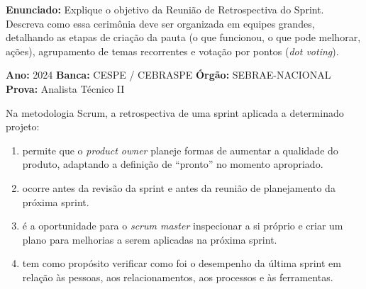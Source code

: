 \documentclass[12pt]{article}
\begin{document}
\vspace{0.15cm}
\noindent\textbf{Enunciado:} Explique o objetivo da Reunião de Retrospectiva do Sprint. Descreva como essa cerimônia deve ser organizada em equipes grandes, detalhando as etapas de criação da pauta (o que funcionou, o que pode melhorar, ações), agrupamento de temas recorrentes e votação por pontos (\textit{dot voting}).

\vspace{0.2cm}
\begin{caixaResposta}
\end{caixaResposta}

\vspace{0.6cm}

\vspace{0.15cm}

\begin{metaConcurso}
\small \textbf{Ano:} 2024 \qquad \textbf{Banca:} CESPE / CEBRASPE \qquad \textbf{Órgão:} SEBRAE-NACIONAL \qquad \textbf{Prova:} Analista Técnico II
\end{metaConcurso}

\vspace{0.15cm}
\noindent Na metodologia Scrum, a retrospectiva de uma sprint aplicada a determinado projeto:

\begin{enumerate}[label=\Alph*)]
    \item permite que o \textit{product owner} planeje formas de aumentar a qualidade do produto, adaptando a definição de ``pronto'' no momento apropriado.
    \item ocorre antes da revisão da sprint e antes da reunião de planejamento da próxima sprint.
    \item é a oportunidade para o \textit{scrum master} inspecionar a si próprio e criar um plano para melhorias a serem aplicadas na próxima sprint.
    \item tem como propósito verificar como foi o desempenho da última sprint em relação às pessoas, aos relacionamentos, aos processos e às ferramentas.
\end{enumerate}

\vspace{0.6cm}

\vspace{0.15cm}
\end{document}
